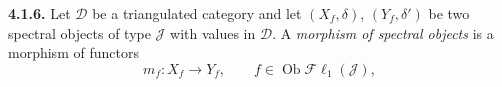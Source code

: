 \medskip\noindent\textbf{4.1.6.}\quad
Let $\mathcal D$ be a triangulated category and let $(X_f,\delta)$,
$(Y_f,\delta')$ be two spectral objects of type $\mathcal J$ with values in
$\mathcal D$. A \emph{morphism of spectral objects} is a morphism of
functors
\[
m_f\colon X_f\longrightarrow Y_f,\qquad
f\in\operatorname{Ob}\mathcal{F}\ell_1(\mathcal J),
\]
\endgroup
